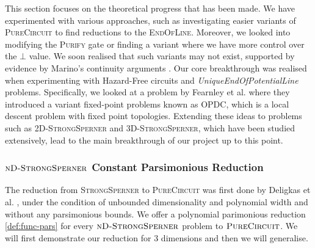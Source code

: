 This section focuses on the theoretical progress that has been  made.
We have experimented with various approaches,
such as investigating easier variants of \textsc{PureCircuit} to find reductions
to the \textsc{EndOfLine}. Moreover, we looked into modifying the \textsc{Purify} gate
or finding a variant where we have more control over the $\bot$ value. We soon
realised that such variants may not exist, supported by evidence by Marino's continuity 
arguments \cite{marino_GeneralTheoryMetastable_1981}.
Our core breakthrough was realised when experimenting with
Hazard-Free circuits and \textit{UniqueEndOfPotentialLine} problems. Specifically,
we looked at a problem by Fearnley et al. \cite{fearnley_UniqueEndPotential_2020} where
they introduced a variant fixed-point problems known as \textsc{OPDC}, which is a 
local descent problem with fixed point topologies. Extending these ideas
to problems such as \textsc{2D-StrongSperner} and \textsc{3D-StrongSperner},
which have been studied extensively, lead to the main breakthrough of our project up to this point.






\subsubsection{$\textnormal{\textsc{nD-StrongSperner}}$ Constant Parsimonious Reduction} \label{sect:main-result}

The reduction from \textsc{StrongSperner} to \textsc{PureCircuit} was first
done by Deligkas et al. \cite{deligkas_PureCircuitTightInapproximability_2024},
under the condition of unbounded dimensionality and polynomial width and without any parsimonious bounds.
We offer a polynomial parimonious reduction \ref{def:func-pars}
for every $\textnormal{\textsc{nD-StrongSperner}}$ problem to  $\textnormal{\textsc{PureCircuit}}$.
We will first demonstrate our reduction for 3 dimensions and then we will generalise.

